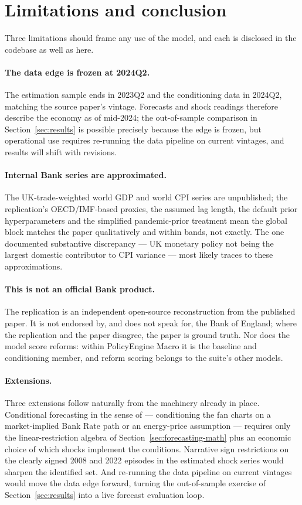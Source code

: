 \section{Limitations and conclusion}
\label{sec:limitations}

Three limitations should frame any use of the model, and each is disclosed in the codebase as well as here.

\paragraph{The data edge is frozen at 2024Q2.} The estimation sample ends in 2023Q2 and the conditioning data in 2024Q2, matching the source paper's vintage. Forecasts and shock readings therefore describe the economy as of mid-2024; the out-of-sample comparison in Section~\ref{sec:results} is possible precisely because the edge is frozen, but operational use requires re-running the data pipeline on current vintages, and results will shift with revisions.

\paragraph{Internal Bank series are approximated.} The UK-trade-weighted world GDP and world CPI series are unpublished; the replication's OECD/IMF-based proxies, the assumed lag length, the default prior hyperparameters and the simplified pandemic-prior treatment mean the global block matches the paper qualitatively and within bands, not exactly. The one documented substantive discrepancy --- UK monetary policy not being the largest domestic contributor to CPI variance --- most likely traces to these approximations.

\paragraph{This is not an official Bank product.} The replication is an independent open-source reconstruction from the published paper. It is not endorsed by, and does not speak for, the Bank of England; where the replication and the paper disagree, the paper is ground truth. Nor does the model score reforms: within PolicyEngine Macro it is the baseline and conditioning member, and reform scoring belongs to the suite's other models.

\paragraph{Extensions.} Three extensions follow naturally from the machinery already in place. Conditional forecasting in the sense of \citet{waggoner1999} --- conditioning the fan charts on a market-implied Bank Rate path or an energy-price assumption --- requires only the linear-restriction algebra of Section~\ref{sec:forecasting-math} plus an economic choice of which shocks implement the conditions. Narrative sign restrictions \citep{antolindiaz2018} on the clearly signed 2008 and 2022 episodes in the estimated shock series would sharpen the identified set. And re-running the data pipeline on current vintages would move the data edge forward, turning the out-of-sample exercise of Section~\ref{sec:results} into a live forecast evaluation loop.

